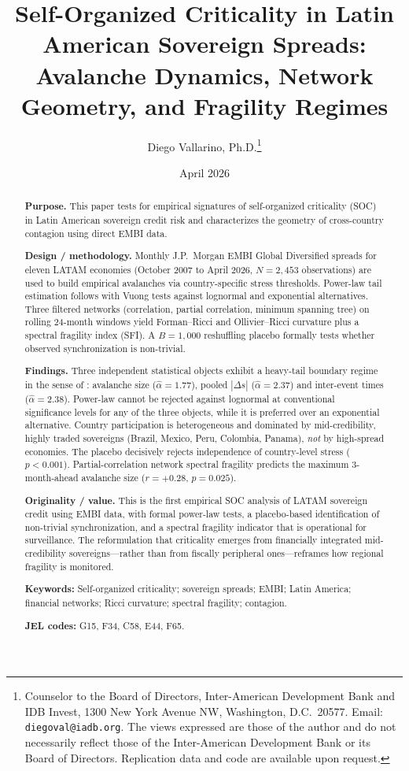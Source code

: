 \documentclass[12pt,a4paper]{article}
\title{\textbf{Self-Organized Criticality in Latin American Sovereign Spreads:\\
Avalanche Dynamics, Network Geometry, and Fragility Regimes}}
\author{Diego Vallarino, Ph.D.\thanks{Counselor to the Board of Directors,
Inter-American Development Bank and IDB Invest, 1300 New York Avenue NW,
Washington, D.C.\ 20577. Email: \texttt{diegoval@iadb.org}.
The views expressed are those of the author and do not necessarily reflect those
of the Inter-American Development Bank or its Board of Directors. Replication
data and code are available upon request.}}
\date{April 2026}
\begin{document}
\maketitle

\begin{abstract}
\noindent\textbf{Purpose.} This paper tests for empirical signatures of
self-organized criticality (SOC) in Latin American sovereign credit risk and
characterizes the geometry of cross-country contagion using direct EMBI data.

\noindent\textbf{Design / methodology.} Monthly J.P.~Morgan EMBI Global
Diversified spreads for eleven LATAM economies (October 2007 to April 2026,
$N=2{,}453$ observations) are used to build empirical avalanches via
country-specific stress thresholds. Power-law tail estimation follows
\citet{Clauset2009} with Vuong tests against lognormal and exponential
alternatives. Three filtered networks (correlation, partial correlation,
minimum spanning tree) on rolling 24-month windows yield Forman--Ricci and
Ollivier--Ricci curvature plus a spectral fragility index (SFI). A
$B=1{,}000$ reshuffling placebo formally tests whether observed synchronization
is non-trivial.

\noindent\textbf{Findings.} Three independent statistical objects exhibit a
heavy-tail boundary regime in the sense of \citet{StumpfPorter2012}: avalanche
size ($\hat{\alpha}=1.77$), pooled $|\Delta s|$ ($\hat{\alpha}=2.37$) and
inter-event times ($\hat{\alpha}=2.38$). Power-law cannot be rejected against
lognormal at conventional significance levels for any of the three objects,
while it is preferred over an exponential alternative. Country participation is
heterogeneous and dominated by mid-credibility, highly traded sovereigns
(Brazil, Mexico, Peru, Colombia, Panama), \emph{not} by high-spread economies.
The placebo decisively rejects independence of country-level stress
($p<0.001$). Partial-correlation network spectral fragility predicts the
maximum 3-month-ahead avalanche size ($r=+0.28$, $p=0.025$).

\noindent\textbf{Originality / value.} This is the first empirical SOC analysis
of LATAM sovereign credit using EMBI data, with formal power-law tests, a
placebo-based identification of non-trivial synchronization, and a spectral
fragility indicator that is operational for surveillance. The reformulation
that criticality emerges from financially integrated mid-credibility
sovereigns---rather than from fiscally peripheral ones---reframes how regional
fragility is monitored.

\medskip
\noindent\textbf{Keywords:} Self-organized criticality; sovereign spreads;
EMBI; Latin America; financial networks; Ricci curvature; spectral fragility;
contagion.

\noindent\textbf{JEL codes:} G15, F34, C58, E44, F65.
\end{abstract}
\end{document}
